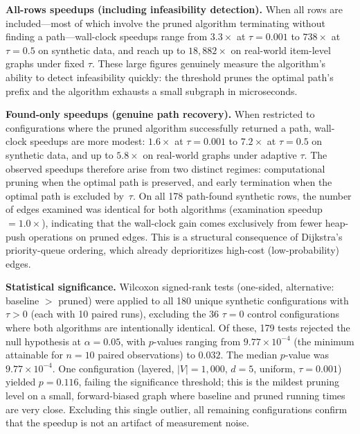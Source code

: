 \textbf{All-rows speedups (including infeasibility detection).} When all rows are included---most of which involve the pruned algorithm terminating without finding a path---wall-clock speedups range from $3.3\times$ at $\tau=0.001$ to $738\times$ at $\tau=0.5$ on synthetic data, and reach up to $18{,}882\times$ on real-world item-level graphs under fixed $\tau$. These large figures genuinely measure the algorithm's ability to detect infeasibility quickly: the threshold prunes the optimal path's prefix and the algorithm exhausts a small subgraph in microseconds.

\textbf{Found-only speedups (genuine path recovery).} When restricted to configurations where the pruned algorithm successfully returned a path, wall-clock speedups are more modest: $1.6\times$ at $\tau=0.001$ to $7.2\times$ at $\tau=0.5$ on synthetic data, and up to $5.8\times$ on real-world graphs under adaptive $\tau$. The observed speedups therefore arise from two distinct regimes: computational pruning when the optimal path is preserved, and early termination when the optimal path is excluded by~$\tau$. On all 178 path-found synthetic rows, the number of edges examined was identical for both algorithms (examination speedup $= 1.0\times$), indicating that the wall-clock gain comes exclusively from fewer heap-push operations on pruned edges. This is a structural consequence of Dijkstra's priority-queue ordering, which already deprioritizes high-cost (low-probability) edges.

\textbf{Statistical significance.} Wilcoxon signed-rank tests (one-sided, alternative: baseline $>$ pruned) were applied to all 180 unique synthetic configurations with $\tau>0$ (each with 10 paired runs), excluding the 36 $\tau=0$ control configurations where both algorithms are intentionally identical. Of these, 179 tests rejected the null hypothesis at $\alpha = 0.05$, with $p$-values ranging from $9.77 \times 10^{-4}$ (the minimum attainable for $n=10$ paired observations) to $0.032$. The median $p$-value was $9.77 \times 10^{-4}$. One configuration (layered, $|V|=1{,}000$, $d=5$, uniform, $\tau=0.001$) yielded $p=0.116$, failing the significance threshold; this is the mildest pruning level on a small, forward-biased graph where baseline and pruned running times are very close. Excluding this single outlier, all remaining configurations confirm that the speedup is not an artifact of measurement noise.

